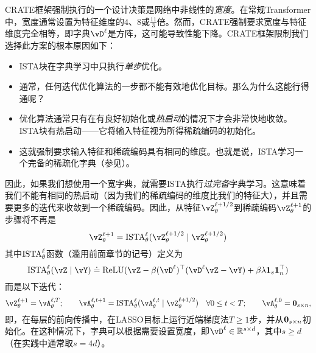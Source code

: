 \documentclass[../../book-main.tex]{subfiles}
\begin{document}
CRATE框架强制执行的一个设计决策是网络中非线性的\textit{宽度}。在常规Transformer中，宽度通常设置为特征维度的\(4\)、\(8\)或\(\frac{11}{3}\)倍。然而，CRATE强制要求宽度与特征维度完全相等，即字典\(\vD^{\ell}\)是方阵，这可能导致性能下降。CRATE框架限制我们选择此方案的根本原因如下：
\begin{itemize}
    \item ISTA块在字典学习中只执行\textit{单步}优化。
    \item 通常，任何迭代优化算法的一步都不能有效地优化目标。那么为什么这能行得通呢？
    \item 优化算法通常只有在有良好初始化或\textit{热启动}的情况下才会非常快地收敛。ISTA块有热启动——它将输入特征视为所得稀疏编码的初始化。
    \item 这就强制要求输入特征和稀疏编码具有相同的维度。也就是说，ISTA学习一个完备的稀疏化字典（参见）。
\end{itemize}
因此，如果我们想使用一个宽字典，就需要ISTA执行\textit{过完备}字典学习。这意味着我们不能有相同的热启动（因为我们的稀疏编码的维度比我们的特征大），并且需要更多的迭代来收敛到一个稀疏编码。因此，从特征\(\vZ_{\theta}^{\ell + 1/2}\)到稀疏编码\(\vZ_{\theta}^{\ell + 1}\)的步骤将不再是
\begin{equation}
    \vZ_{\theta}^{\ell + 1} = \ISTA_{\theta}^{\ell}(\vZ_{\theta}^{\ell + 1/2} \mid \vZ_{\theta}^{\ell + 1/2})
\end{equation}
其中\(\operatorname{ISTA}_{\theta}^{\ell}\)函数（滥用前面章节的记号）定义为
\begin{equation}
    \ISTA_{\theta}^{\ell}(\vZ \mid \vY) \doteq \ReLU(\vZ - \beta (\vD^{\ell})^{\top}(\vD^{\ell}\vZ - \vY) + \beta \lambda \vone_{s}\vone_{n}^{\top})
\end{equation}
而是以下迭代：
\begin{equation}
    \vZ_{\theta}^{\ell + 1} = \vA_{\theta}^{\ell, T}; \qquad \vA_{\theta}^{\ell, t + 1} = \ISTA_{\theta}^{\ell}(\vA_{\theta}^{\ell, t} \mid \vZ_{\theta}^{\ell + 1/2}) \quad \forall 0 \leq t < T; \qquad \vA_{\theta}^{\ell, 0} = \vzero_{s \times n},
\end{equation}
即，在每层的前向传播中，在LASSO目标上运行近端梯度法\(T \geq 1\)步，并从\(\bm{0}_{s \times n}\)初始化。在这种情况下，字典可以根据需要设置宽度，即\(\vD^{\ell} \in \R^{s \times d}\)，其中\(s \geq d\)（在实践中通常取\(s = 4d\)）。
\end{document}
